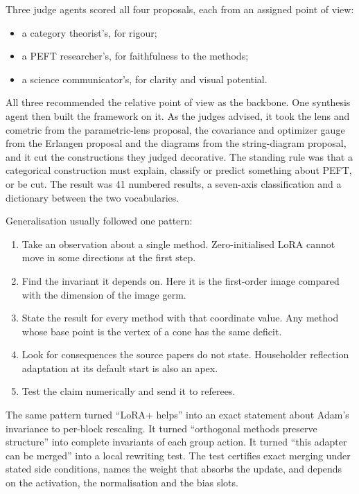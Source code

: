 Three judge agents scored all four proposals, each from an assigned point of view:

\begin{itemize}
\item a category theorist's, for rigour;
\item a PEFT researcher's, for faithfulness to the methods;
\item a science communicator's, for clarity and visual potential.
\end{itemize}

All three recommended the relative point of view as the backbone. One synthesis agent then built the framework on it. As the judges advised, it took the lens and cometric from the parametric-lens proposal, the covariance and optimizer gauge from the Erlangen proposal and the diagrams from the string-diagram proposal, and it cut the constructions they judged decorative. The standing rule was that a categorical construction must explain, classify or predict something about PEFT, or be cut. The result was 41 numbered results, a seven-axis classification and a dictionary between the two vocabularies.

Generalisation usually followed one pattern:

\begin{enumerate}
\item Take an observation about a single method. Zero-initialised LoRA cannot move in some directions at the first step.
\item Find the invariant it depends on. Here it is the first-order image compared with the dimension of the image germ.
\item State the result for every method with that coordinate value. Any method whose base point is the vertex of a cone has the same deficit.
\item Look for consequences the source papers do not state. Householder reflection adaptation at its default start is also an apex.
\item Test the claim numerically and send it to referees.
\end{enumerate}

The same pattern turned ``LoRA+ helps'' into an exact statement about Adam's invariance to per-block rescaling. It turned ``orthogonal methods preserve structure'' into complete invariants of each group action. It turned ``this adapter can be merged'' into a local rewriting test. The test certifies exact merging under stated side conditions, names the weight that absorbs the update, and depends on the activation, the normalisation and the bias slots.

